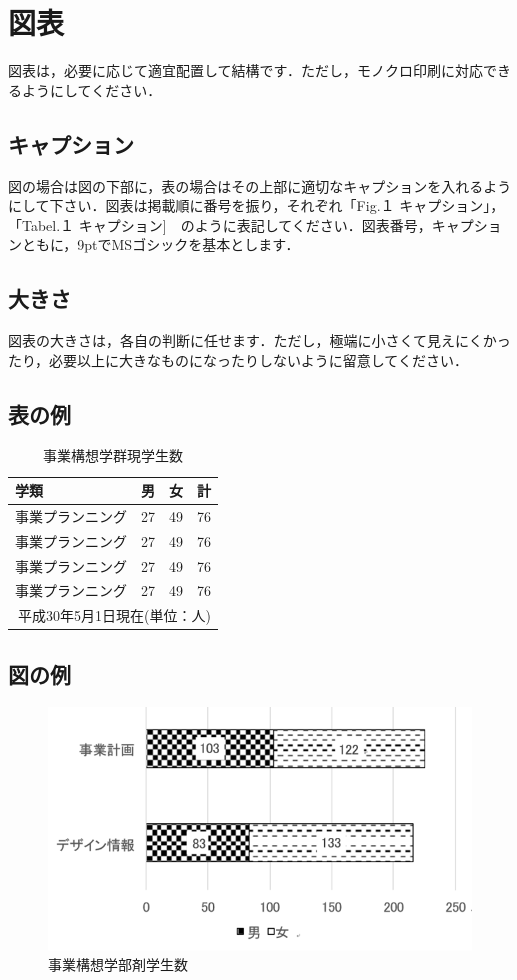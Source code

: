 \documentclass[paper=a4paper,jafontsize=9pt,twocolumn,number_oflines=45,line_length=28zw]{myuarticle}
\begin{document}
\section{図表}
図表は，必要に応じて適宜配置して結構です．ただし，モノクロ印刷に対応できるようにしてください．

\subsection{キャプション}
図の場合は図の下部に，表の場合はその上部に適切なキャプションを入れるようにして下さい．図表は掲載順に番号を振り，それぞれ「Fig.１ キャプション」，「Tabel.１ キャプション]　のように表記してください．図表番号，キャプションともに，9ptでMSゴシックを基本とします．

\subsection{大きさ}
図表の大きさは，各自の判断に任せます．ただし，極端に小さくて見えにくかったり，必要以上に大きなものになったりしないように留意してください．

\subsection{表の例}
\begin{table}[h]
\caption{事業構想学群現学生数}
\label{tab:myu-student-number}
\centering
\begin{tabular}{|p{}|p{}|p{}|p{}|}
  \hline
  学類 & 男 & 女 & 計 \\
  \hline
  事業プランニング & 27  & 49 & 76 \\
  \hline
  事業プランニング & 27  & 49 & 76 \\
  \hline
  事業プランニング & 27  & 49 & 76 \\
  \hline
  事業プランニング & 27  & 49 & 76 \\
  \hline
  \multicolumn{4}{r}{平成30年5月1日現在(単位：人)} \\
\end{tabular}
\end{table}

\subsection{図の例}
\begin{figure}[h]
\centering
\includegraphics[keepaspectratio, width=0.8\columnwidth]{images/image.png}
\caption[short]{事業構想学部剤学生数}
\label{fig:myu-student-number}
\end{figure}
\end{document}
